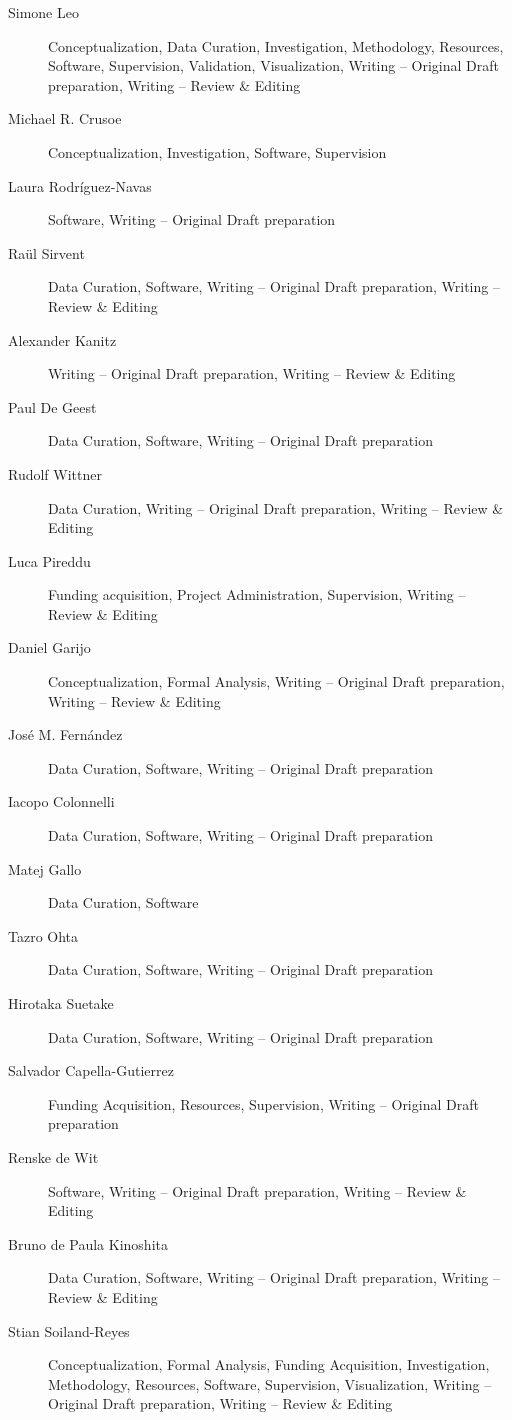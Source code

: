 \documentclass[10pt,letterpaper]{article}
\begin{document}
\begin{description}
\item[Simone Leo]
Conceptualization, Data Curation, Investigation, Methodology, Resources, Software, Supervision, Validation, Visualization, Writing – Original Draft preparation, Writing – Review \& Editing
\item[Michael R. Crusoe]
Conceptualization, Investigation, Software, Supervision
\item[Laura Rodríguez-Navas]
Software, Writing – Original Draft preparation
\item[Raül Sirvent]
Data Curation, Software, Writing – Original Draft preparation, Writing – Review \& Editing
\item[Alexander Kanitz]
Writing – Original Draft preparation, Writing – Review \& Editing
\item[Paul De Geest]
Data Curation, Software, Writing – Original Draft preparation
\item[Rudolf Wittner]
Data Curation, Writing – Original Draft preparation, Writing – Review \& Editing
\item[Luca Pireddu]
Funding acquisition, Project Administration, Supervision, Writing – Review \& Editing
\item[Daniel Garijo]
Conceptualization, Formal Analysis, Writing – Original Draft preparation, Writing – Review \& Editing
\item[José M. Fernández]
Data Curation, Software, Writing – Original Draft preparation
\item[Iacopo Colonnelli]
Data Curation, Software, Writing – Original Draft preparation
\item[Matej Gallo]
Data Curation, Software
\item[Tazro Ohta]
Data Curation, Software, Writing – Original Draft preparation
\item[Hirotaka Suetake]
Data Curation, Software, Writing – Original Draft preparation
\item[Salvador Capella-Gutierrez]
Funding Acquisition, Resources, Supervision, Writing – Original Draft preparation
\item[Renske de Wit]
Software, Writing – Original Draft preparation, Writing – Review \& Editing
\item[Bruno de Paula Kinoshita]
Data Curation, Software, Writing – Original Draft preparation, Writing – Review \& Editing
\item[Stian Soiland-Reyes]
Conceptualization, Formal Analysis, Funding Acquisition, Investigation, Methodology, Resources, Software, Supervision, Visualization, Writing – Original Draft preparation, Writing – Review \& Editing
\end{description}
\end{document}
